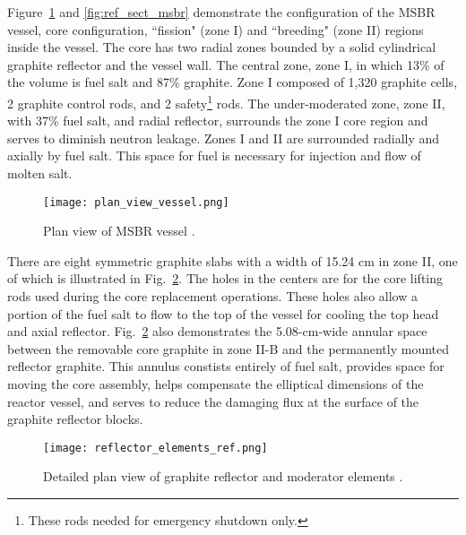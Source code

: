 Figure~\ref{fig:ref_plan_msbr} and \ref{fig:ref_sect_msbr} demonstrate the configuration of the \gls{MSBR} vessel, core configuration, ``fission" (zone I) and ``breeding" (zone II) regions inside the vessel. The core has two radial zones bounded by a solid cylindrical graphite reflector and the vessel wall. The central zone, zone I, in which 13\% of the volume is fuel salt and 87\% graphite. Zone I composed of 1,320 graphite cells, 2 graphite control rods, and 2 safety\footnote{These rods needed for emergency shutdown only.} rods. The under-moderated zone, zone II, with 37\% fuel salt, and radial reflector, surrounds the zone I core region and serves to diminish neutron leakage. Zones I and II are surrounded radially and axially by fuel salt. This space for fuel is necessary for injection and flow of molten salt.

\begin{figure}[hbp!] %
  \centering
  \vspace{-0.3em}
  \texttt{[image: plan\_view\_vessel.png]}
  \caption{Plan view of \gls{MSBR} vessel \cite{robertson_conceptual_1971}.}
  \vspace{-0.6em}
  \label{fig:ref_plan_msbr}
\end{figure}
\FloatBarrier

There are eight symmetric graphite slabs with a width of 15.24 cm in zone II, one of which is illustrated in Fig.~\ref{fig:detail_plan_view}. The holes in the centers are for the core lifting rods used during the core replacement operations. These holes also allow a portion of the fuel salt to flow to the top of the vessel for cooling the top head and axial reflector. Fig.~\ref{fig:detail_plan_view} also demonstrates the 5.08-cm-wide annular space between the removable core graphite in zone II-B and the permanently mounted reflector graphite. This annulus constists entirely of fuel salt, provides space for moving the core assembly, helps compensate the elliptical dimensions of the reactor vessel, and serves to reduce the damaging flux at the surface of the graphite reflector blocks.

\begin{figure}[hbp!] %
  \centering
  \vspace{-0.3em}
  \texttt{[image: reflector\_elements\_ref.png]}
  \caption{Detailed plan view of graphite reflector and moderator elements \cite{robertson_conceptual_1971}.}
  \vspace{-0.6em}
  \label{fig:detail_plan_view}
\end{figure}
\FloatBarrier

